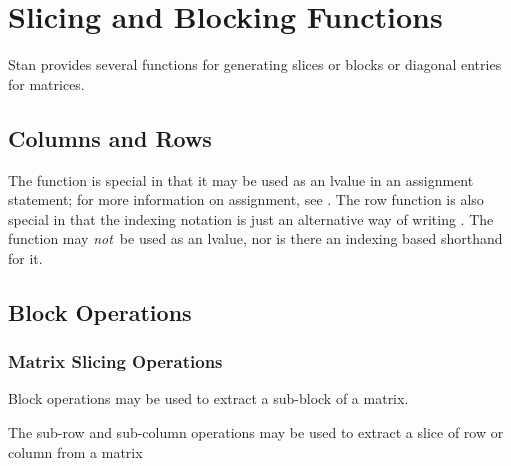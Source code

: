 \section{Slicing and Blocking Functions}

Stan provides several functions for generating slices or blocks or
diagonal entries for matrices.

\subsection{Columns and Rows}

\begin{description}
%
%
%
\end{description}

The  function is special in that it may be used as an lvalue
in an assignment statement; for more information on assignment, see
.  The row function is also special
in that the indexing notation  is just an alternative way
of writing .  The  function may {\it not}\, be
used as an lvalue, nor is there an indexing based shorthand for it.


\subsection{Block Operations}

\subsubsection{Matrix Slicing Operations}

Block operations may be used to extract a sub-block of a matrix.

\begin{description}
\end{description}
%
The sub-row and sub-column operations may be used to extract a
slice of row or column from a matrix
%
\begin{description}
%
%
%
\end{description}

